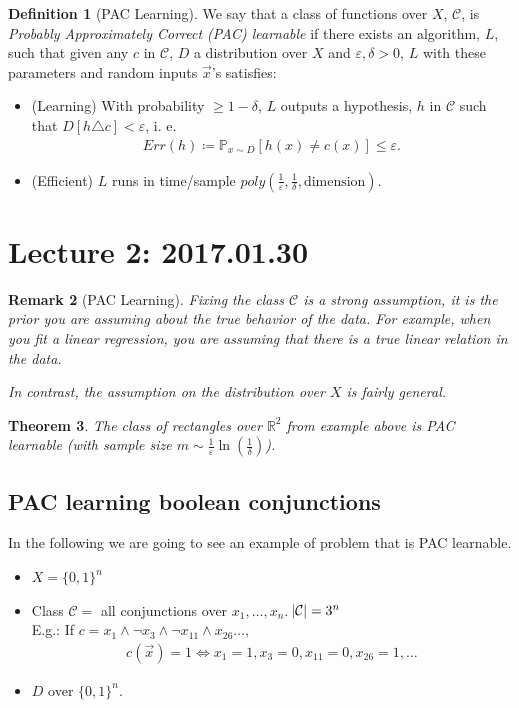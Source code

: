 \documentclass[12pt, letterpaper]{article}
\numberwithin{equation}{section} %
\newcommand{\R}{\mathbb{R}}
\newcommand{\mb}{\mathbb}
\newcommand{\mc}{\mathcal}
\newcommand{\ve}{\varepsilon}
\newtheorem{theorem}{Theorem}[section]
\newtheorem{remark}[theorem]{Remark}
\theoremstyle{definition}
\newtheorem{definition}[theorem]{Definition}
\theoremstyle{remark}
\begin{document}
\begin{definition}[PAC Learning]
	We say that a class of functions over $X$, $\mc C$, is \emph{Probably Approximately Correct (PAC) learnable} if there exists an algorithm, $L$, such that given any $c$ in $\mc C$, $D$ a distribution over $X$ and $\ve, \delta >0$, $L$ with these parameters and random inputs $\vec x$'s satisfies:  
	\begin{itemize}
		\item (Learning) With probability $\geq 1 -\delta$, $L$ outputs a hypothesis, $h$ in $\mc 
		C$ such that $D[h\triangle c]<\ve$, i. e.
		\begin{align}
    		Err(h) \coloneqq \mb P_{x\sim D}[h(x) \ne c(x)] \leq \ve.
		\end{align}
		\item (Efficient) $L$ runs in time/sample $poly\left(\frac1\ve, \frac1\delta, \textrm{dimension}\right)$.
	\end{itemize}
\end{definition}


\section{Lecture 2: 2017.01.30}

\begin{remark}[PAC Learning]
    Fixing the class $\mc C$ is a strong assumption, it is the prior you are assuming about the true behavior of the data.
     For example, when you fit a linear regression, you are assuming that there is a true linear relation in the data.
    
    In contrast, the assumption on the distribution over $X$ is fairly general.
\end{remark}

\begin{theorem}
    The class of rectangles over $\R^2$ from example above is PAC learnable (with sample size $m\sim\frac1\ve\ln\left(\frac1\delta\right)$).
\end{theorem}

\subsection{PAC learning boolean conjunctions}

In the following we are going to see an example of problem that is PAC learnable.
\begin{itemize}
    \item $X = \lbrace 0, 1 \rbrace^n$
    \item Class $\mc C = $ all conjunctions over $x_1,\ldots,x_n$. $\abs{\mc C} = 3^n$\\
          E.g.: If $c = x_1\wedge \lnot x_3 \wedge \lnot x_{11} \wedge x_{26} \ldots$,
          \begin{align}
              c(\vec x) = 1 \iff x_1 =1, x_3 = 0, x_{11} = 0, x_{26} = 1, \ldots
          \end{align}
    \item $D$ over $\lbrace 0, 1 \rbrace^n$.
\end{itemize}
\end{document}

